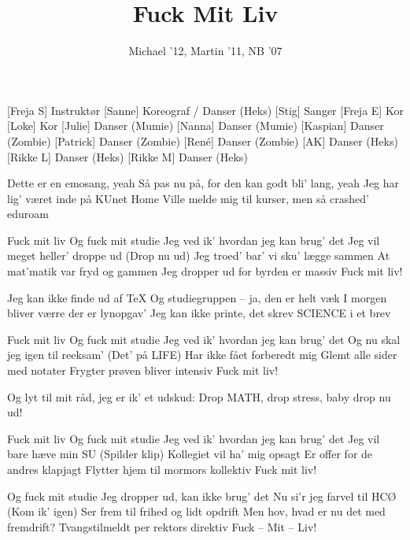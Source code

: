 \documentclass[a4paper,11pt]{article}
\title{Fuck Mit Liv}
\author{Michael '12, Martin '11, NB '07}
\begin{document}
\maketitle

\begin{roles}
[Freja S] Instruktør
[Sanne] Koreograf / Danser (Heks)
[Stig] Sanger
[Freja E] Kor
[Loke] Kor
[Julie] Danser (Mumie)
[Nanna] Danser (Mumie)
[Kaspian] Danser (Zombie)
[Patrick] Danser (Zombie)
[René] Danser (Zombie)
[AK] Danser (Heks)
[Rikke L] Danser (Heks)
[Rikke M] Danser (Heks)
\end{roles}

\begin{song}
 Dette er en emosang, yeah
Så pas nu på, for den kan godt bli' lang, yeah
Jeg har lig' været inde på KUnet Home
Ville melde mig til kurser, men så crashed' eduroam

 Fuck mit liv
Og fuck mit studie
Jeg ved ik' hvordan jeg kan brug' det
Jeg vil meget heller' droppe ud
(Drop nu ud)
Jeg troed' bar' vi sku' lægge sammen
At mat'matik var fryd og gammen
Jeg dropper ud for byrden er massiv
Fuck mit liv!

 Jeg kan ikke finde ud af \TeX
Og studiegruppen -- ja, den er helt væk
I morgen bliver værre der er lynopgav'
Jeg kan ikke printe, det skrev SCIENCE i et brev

 Fuck mit liv
Og fuck mit studie
Jeg ved ik' hvordan jeg kan brug' det
Og nu skal jeg igen til reeksam'
(Det' på LIFE)
Har ikke fået forberedt mig
Glemt alle sider med notater
Frygter prøven bliver intensiv
Fuck mit liv!

 Og lyt til mit råd, jeg er ik' et udskud:
Drop MATH, drop stress, baby drop nu ud!

 Fuck mit liv
Og fuck mit studie
Jeg ved ik' hvordan jeg kan brug' det
Jeg vil bare hæve min SU
(Spilder klip)
Kollegiet vil ha' mig opsagt
Er offer for de andres klapjagt
Flytter hjem til mormors kollektiv
Fuck mit liv!

 Og fuck mit studie
Jeg dropper ud, kan ikke brug' det
Nu si'r jeg farvel til HCØ
(Kom ik' igen)
Ser frem til frihed og lidt opdrift
Men hov, hvad er nu det med fremdrift?
Tvangstilmeldt per rektors direktiv
Fuck -- Mit -- Liv!
\end{song}
\end{document}
